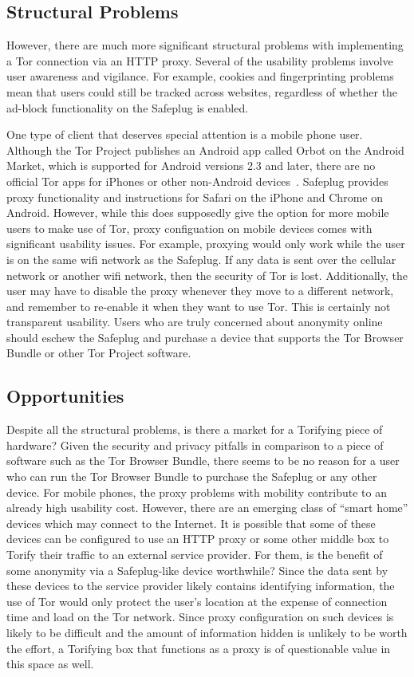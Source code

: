 \documentclass[letterpaper,twocolumn,10pt]{article}
\begin{document}
\subsection{Structural Problems}
However, there are much more significant structural problems with implementing a Tor connection via an HTTP proxy.  Several of the usability problems involve user awareness and vigilance.  For example, cookies and fingerprinting problems mean that users could still be tracked across websites, regardless of whether the ad-block functionality on the Safeplug is enabled.  

One type of client that deserves special attention is a mobile phone user.  Although the Tor Project publishes an Android app called Orbot on the Android Market, which is supported for Android versions 2.3 and later, there are no official Tor apps for iPhones or other non-Android devices~\cite{orbot,amorbot}.  Safeplug provides proxy functionality and instructions for Safari on the iPhone and Chrome on Android.  However, while this does supposedly give the option for more mobile users to make use of Tor, proxy configuation on mobile devices comes with significant usability issues.  For example, proxying would only work while the user is on the same wifi network as the Safeplug.  If any data is sent over the cellular network or another wifi network, then the security of Tor is lost.  Additionally, the user may have to disable the proxy whenever they move to a different network, and remember to re-enable it when they want to use Tor.  This is certainly not transparent usability.  Users who are truly concerned about anonymity online should eschew the Safeplug and purchase a device that supports the Tor Browser Bundle or other Tor Project software.

\subsection{Opportunities}
Despite all the structural problems, is there a market for a Torifying piece of hardware?  Given the security and privacy pitfalls in comparison to a piece of software such as the Tor Browser Bundle, there seems to be no reason for a user who can run the Tor Browser Bundle to purchase the Safeplug or any other device.  For mobile phones, the proxy problems with mobility contribute to an already high usability cost.  However, there are an emerging class of ``smart home'' devices which may connect to the Internet.  It is possible that some of these devices can be configured to use an HTTP proxy or some other middle box to Torify their traffic to an external service provider.  For them, is the benefit of some anonymity via a Safeplug-like device worthwhile?  Since the data sent by these devices to the service provider likely contains identifying information, the use of Tor would only protect the user's location at the expense of connection time and load on the Tor network.  Since proxy configuration on such devices is likely to be difficult and the amount of information hidden is unlikely to be worth the effort, a Torifying box that functions as a proxy is of questionable value in this space as well.
\end{document}
